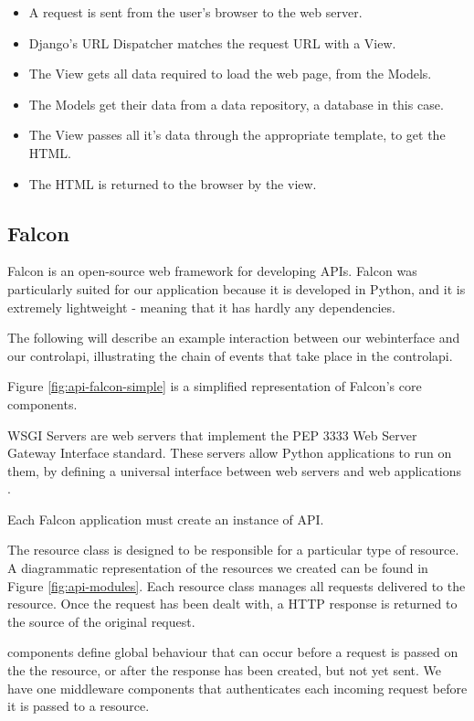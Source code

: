 \begin{itemize}
\item A request is sent from the user's browser to the web server.
\item Django's URL Dispatcher matches the request URL with a View.
\item The View gets all data required to load the web page, from the Models.
\item The Models get their data from a data repository, a database in this case.
\item The View passes all it's data through the appropriate template, to get the HTML.
\item The HTML is returned to the browser by the view.
\end{itemize}

\subsection{Falcon}

Falcon is an open-source web framework for developing \glspl{API}. Falcon was particularly suited for our application because it is developed in Python, and it is extremely lightweight - meaning that it has hardly any dependencies.

The following will describe an example interaction between our \gls{webinterface} and our \gls{controlapi}, illustrating the chain of events that take place in the \gls{controlapi}.

Figure \ref{fig:api-falcon-simple} is a simplified representation of Falcon's core components. 

\begin{description}
\item{WSGI Servers} are web servers that implement the PEP 3333 Web Server Gateway Interface standard. These servers allow Python applications to run on them, by defining a universal interface between web servers and web applications \cite{pep-3333}.

\item [Application] Each Falcon application must create an instance of API. 

\item [Resource] The resource class is designed to be responsible for a particular type of resource. A diagrammatic representation of the resources we created can be found in Figure \ref{fig:api-modules}. Each resource class manages all requests delivered to the resource. Once the request has been dealt with, a HTTP response is returned to the source of the original request.

\item [Middleware] components define global behaviour that can occur before a request is passed on the the resource, or after the response has been created, but not yet sent. We have one middleware components that authenticates each incoming request before it is passed to a resource.
\end{description}

